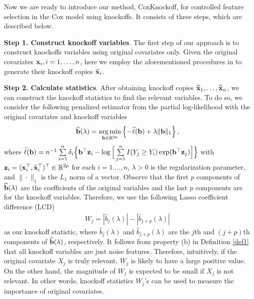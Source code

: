 \documentclass[11pt]{article}
\def\bx{{\bf x}}
\def\bz{{\bf z}}
\def\bb{{\bf b}}
\DeclareMathOperator*{\argmin}{arg\,min}
\begin{document}
Now we are ready to introduce our method, CoxKnockoff, for controlled feature selection in the Cox model using knockoffs. It consists of three steps, which are described below.

{\bf Step 1. Construct knockoff variables}.  The first step of our approach is to construct knockoffs variables using original covariates only. Given the original covariates $\bx_i, i=1, \ldots, n$, here we employ the aforementioned procedures in \cite{candes2018panning} to generate their 
knockoff copies 
$\widetilde{\bx}_i$.

{\bf Step 2. Calculate statistics}.
After obtaining knockoff copies $\widetilde{\bx}_1, \ldots, \widetilde{\bx}_n$, we can construct the
knockoff statistics to find the relevant variables. To do so, %
we consider the following penalized estimator from the partial log-likelihood with the original covariates and knockoff variables
\begin{align}\label{eq: hat-b}
\widehat{\bb}(\lambda)
=\argmin_{\bb\in\mathbb{R}^{2p}}\left\{-\widetilde{\ell}(\bb)+\lambda\|\bb\|_1\right\},
\end{align}
where  $\widetilde{\ell}(\bb)=n^{-1}\sum\limits_{i=1}^{n}\delta_i
\Big\{\bb^{\top}\bz_i-\log\Big[\sum\limits_{j=1}^{n}I(Y_j\geq Y_i) \exp(\bb^{\top}\bz_j)\Big] \Big\}$ with $\bz_i=(\bx_i^{\top}, \widetilde{\bx}_i^{\top})^{\top}\in\mathbb{R}^{2p}$ for each $i=1. \ldots, n$, $\lambda>0$ is the regularization parameter, and $\|\cdot\|_1$ is the $L_1$ norm of a vector.
Observe that the first $p$ components of $\widehat{\bb}(\lambda)$ are the coefficients of the original
variables and the last $p$ components are for the knockoff variables. Therefore, we use the following Lasso coefficient difference (LCD) 
\begin{align}\label{eq: Statistic-Wj}
W_j = |\widehat{b}_j(\lambda)| - |\widehat{b}_{j+p}(\lambda)|
\end{align}
as our knockoff statistic, where $\widehat{b}_j(\lambda)$ and $\widehat{b}_{j+p}(\lambda)$ are the $j$th and $(j+p)$th components of $\widehat{\bb}(\lambda)$, respectively.
It follows from property (b) in Definition \ref{def1} that all knockoff variables are just noise features. Therefore,  
intuitively, if the original covariate $X_j$ is truly relevant, $W_j$ is likely to have a large positive value.  On the other hand, the magnitude of $W_j$ is expected to be small if $X_j$ is not relevant. In other words, knockoff statistics $W_j$'s can be used to measure the importance of original covariates.
\end{document}
